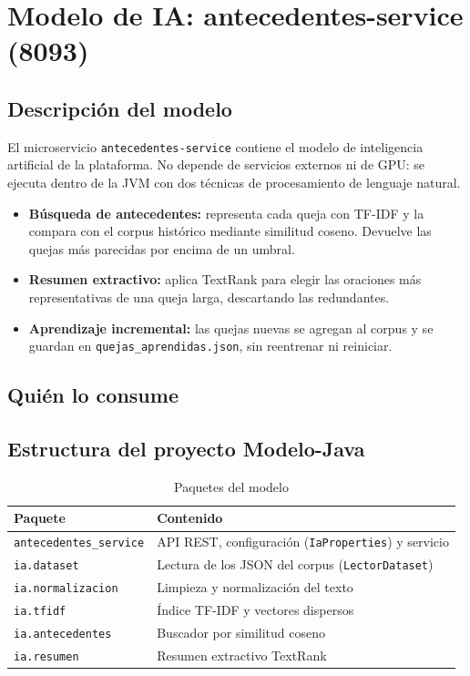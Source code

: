 \section{Modelo de IA: antecedentes-service (8093)}\label{sec:modelo}

\subsection{Descripción del modelo}
El microservicio \texttt{antecedentes-service} contiene el modelo de inteligencia artificial de la plataforma. No depende de servicios externos ni de GPU: se ejecuta dentro de la JVM con dos técnicas de procesamiento de lenguaje natural.
\begin{itemize}
  \item \textbf{Búsqueda de antecedentes:} representa cada queja con TF-IDF y la compara con el corpus histórico mediante similitud coseno. Devuelve las quejas más parecidas por encima de un umbral.
  \item \textbf{Resumen extractivo:} aplica TextRank para elegir las oraciones más representativas de una queja larga, descartando las redundantes.
  \item \textbf{Aprendizaje incremental:} las quejas nuevas se agregan al corpus y se guardan en \texttt{quejas\_aprendidas.json}, sin reentrenar ni reiniciar.
\end{itemize}

\subsection{Quién lo consume}

\subsection{Estructura del proyecto Modelo-Java}
\begin{table}[H]
\centering
\caption{Paquetes del modelo}
\begin{tabular}{ll}
\toprule
\textbf{Paquete} & \textbf{Contenido} \\
\midrule
\texttt{antecedentes\_service} & API REST, configuración (\texttt{IaProperties}) y servicio \\
\texttt{ia.dataset} & Lectura de los JSON del corpus (\texttt{LectorDataset}) \\
\texttt{ia.normalizacion} & Limpieza y normalización del texto \\
\texttt{ia.tfidf} & Índice TF-IDF y vectores dispersos \\
\texttt{ia.antecedentes} & Buscador por similitud coseno \\
\texttt{ia.resumen} & Resumen extractivo TextRank \\
\bottomrule
\end{tabular}
\end{table}

